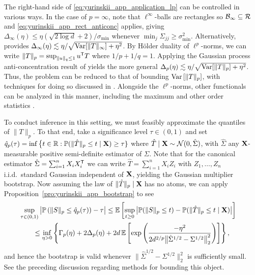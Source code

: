 The right-hand side of
\eqref{eq:yurinskii_app_application_lp} can be controlled in various ways.
%
In the case of $p=\infty$,
note that $\ell^\infty$-balls are rectangles so
$\mathcal{B}_\infty\subseteq \mathcal{R}$
and \eqref{eq:yurinskii_app_rect_anticonc} applies, giving
$\Delta_\infty(\eta) \leq \eta (\sqrt{2\log d} + 2) / \sigma_{\min}$
whenever $\min_j \Sigma_{j j} \geq \sigma_{\min}^2$.
Alternatively, \citet[Theorem~1]{giessing2023anti} provides
$\Delta_\infty(\eta) \lesssim \eta / \sqrt{\operatorname{Var}[\|T\|_\infty] + \eta^2}$.
By H{\"o}lder duality of $\ell^p$-norms, we can write
$\|T\|_p = \sup_{\|u\|_q \leq 1} u^{\mathsf{T}} T$ where $1/p + 1/q = 1$.
Applying the Gaussian process anti-concentration result of
\citet[Theorem~2]{giessing2023anti} yields the more general
$\Delta_p(\eta) \lesssim \eta / \sqrt{\operatorname{Var}[\|T\|_p] + \eta^2}$.
Thus, the problem can be reduced to that of bounding
$\operatorname{Var}\left[\|T\|_p\right]$, with techniques for doing so
discussed in \citet[Section~4]{giessing2023anti}.
Alongside the $\ell^p$-norms, other functionals can be analyzed in this manner,
including the maximum and other order statistics
\citep{kozbur2021dimension,giessing2023anti}.

To conduct inference in this setting, we must feasibly
approximate the quantiles of $\|T\|_p$.
To that end, take a significance level $\tau\in(0,1)$ and set
%
$\hat q_p(\tau) =
\inf \big\{t \in \mathbb{R}: \mathbb{P}(\|\hat T\|_p \leq t \mid \mathbf{X}) \geq \tau \}$
where $\hat T \mid \mathbf{X} \sim \mathcal{N}(0, \hat\Sigma)$,
%
with $\hat\Sigma$ any $\mathbf{X}$-measurable positive semi-definite
estimator of $\Sigma$.
Note that for the canonical estimator $\hat\Sigma = \sum_{i=1}^n X_i X_i^{\mathsf{T}}$
we can write $\hat T =\sum_{i=1}^n X_i Z_i$ with
$Z_1,\dots,Z_n$ i.i.d.\ standard Gaussian independent of $\mathbf{X}$,
yielding the Gaussian multiplier bootstrap.
Now assuming
the law of $\|\hat T\|_p \mid \mathbf{X}$ has no atoms,
we can apply Proposition~\ref{pro:yurinskii_app_bootstrap}
to see
%
\begin{align*}
  &\sup_{\tau\in(0,1)}
  \big|\mathbb{P}\left(\|S\|_p \leq \hat q_p(\tau)\right) - \tau \big|
  \leq
  \mathbb{E}\left[
    \sup_{t \geq 0}
    \big|
    \mathbb{P}(\|S\|_p \leq t)
    - \mathbb{P}(\|\hat T\|_p \leq t \mid \mathbf{X})
    \big|
  \right] \\
  &\qquad\leq
  \inf_{\eta>0}
  \left\{ \Gamma_p(\eta)
    + 2 \Delta_p(\eta)
    + 2d\, \mathbb{E}\left[
      \exp\left(\frac{-\eta^2}
      {2d^{2/p}\big\|\hat \Sigma^{1/2} - \Sigma^{1/2}\big\|_2^2}\right)
    \right]
  \right\},
\end{align*}
%
and hence the bootstrap is valid whenever
$\|\hat \Sigma^{1/2} - \Sigma^{1/2}\big\|_2^2$ is sufficiently small. See the
preceding discussion regarding methods for bounding this object.

